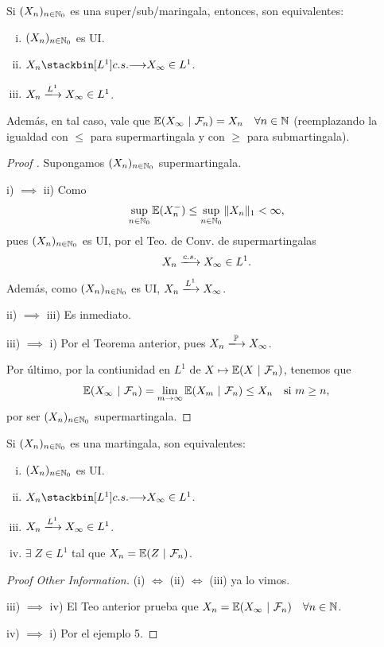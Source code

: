 \begin{theorem}
	Si $(X_{n})_{n \in \mathbb{N}_{0}}$ es una super/sub/maringala, entonces, son equivalentes:
	\begin{enumerate}[i)]
		\item $(X_{n})_{n \in \mathbb{N}_{0}}$ es UI.

		\item $X_{n} \stackbin[L^{1}]{c.s.}{\longrightarrow} X_{\infty} \in L^{1}$.

		\item $X_{n} \xlongrightarrow{L^{1}} X_{\infty} \in L^{1}$.
	\end{enumerate}
	Además, en tal caso, vale que $\mathbb{E}(X_{\infty} \ | \ \mathcal{F}_{n}) = X_{n} \quad \forall n \in \mathbb{N}$ (reemplazando la igualdad con $\leq$ para supermartingala y con $\geq$ para submartingala).
\end{theorem}
\begin{proof}[Proof ]
	Supongamos $(X_{n})_{n \in \mathbb{N}_{0}}$ supermartingala. \par
	i) $\implies$ ii) Como
	\[ \sup_{n \in \mathbb{N}_{0}} \mathbb{E}(X_{n}^{-}) \leq \sup_{n \in \mathbb{N}_{0}} \| X_{n} \|_{1} < \infty, \]
	pues $(X_{n})_{n \in \mathbb{N}_{0}}$ es UI, por el Teo. de Conv. de supermartingalas
	\[ X_{n} \xlongrightarrow{c.s.} X_{\infty} \in L^{1}. \]
	Además, como $(X_{n})_{n \in \mathbb{N}_{0}}$ es UI, $X_{n} \xlongrightarrow{L^{1}} X_{\infty}$. \par
	ii) $\implies$ iii) Es inmediato. \par
	iii) $\implies$ i) Por el Teorema anterior, pues $X_{n} \xlongrightarrow{\mbb{P}} X_{\infty}$. \par
	\medskip
	Por último, por la contiunidad en $L^{1}$ de $X \mapsto \mbb{E}(X \ | \ \mcal{F}_{n})$, tenemos que
	\[ \mathbb{E}(X_{\infty} \ | \ \mathcal{F}_{n}) = \lim_{m \to \infty} \mathbb{E}(X_{m} \ | \ \mathcal{F}_{n}) \leq X_{n} \quad \text{si } m \geq n, \]
	por ser $(X_{n})_{n \in \mathbb{N}_{0}}$ supermartingala.
\end{proof}

\begin{theorem}
	Si $(X_{n})_{n \in \mathbb{N}_{0}}$ es una martingala, son equivalentes:
	\begin{enumerate}[i)]
		\item $(X_{n})_{n \in \mathbb{N}_{0}}$ es UI.

		\item $X_{n} \stackbin[L^{1}]{c.s.}{\longrightarrow} X_{\infty} \in L^{1}$.

		\item $X_{n} \xlongrightarrow{L^{1}} X_{\infty} \in L^{1}$.

		\item $\exists \; Z \in L^{1}$ tal que $X_{n} = \mbb{E}(Z \ | \ \mcal{F}_{n})$.
	\end{enumerate}
\end{theorem}
\begin{proof}[Proof Other Information]
	(i) $\iff$ (ii) $\iff$ (iii) ya lo vimos. \par
	iii) $\implies$ iv) El Teo anterior prueba que $X_{n} = \mathbb{E}(X_{\infty} \ | \ \mathcal{F}_{n}) \quad \forall n \in \mathbb{N}$. \par
	iv) $\implies$ i) Por el ejemplo 5.
\end{proof}

